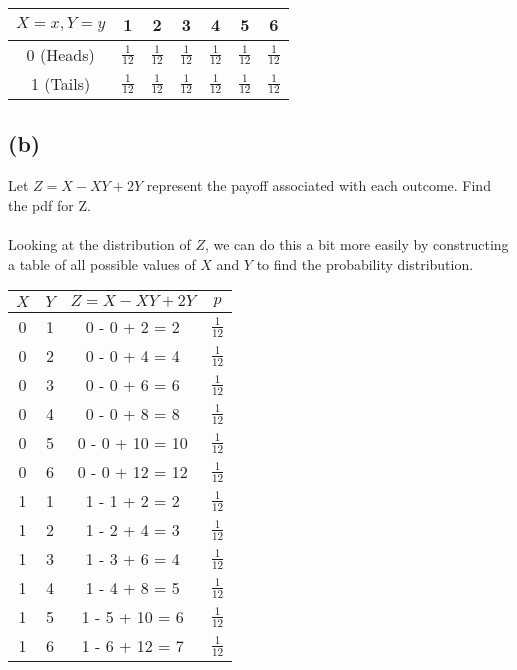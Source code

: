 \documentclass{article}
\begin{document}
{\begin{center}
\begin{tabular}{ | c | c | c | c | c | c | c | }
\hline
\(X=x, Y=y\) & 1 & 2 & 3 & 4 & 5 & 6 \\
\hline
0 (Heads) & \(\frac{1}{12}\) & \(\frac{1}{12}\) & \(\frac{1}{12}\) & \(\frac{1}{12}\) & \(\frac{1}{12}\) & \(\frac{1}{12}\) \\
\hline
1 (Tails) & \(\frac{1}{12}\) & \(\frac{1}{12}\) & \(\frac{1}{12}\) & \(\frac{1}{12}\) & \(\frac{1}{12}\) & \(\frac{1}{12}\) \\
\hline
\end{tabular}
\end{center}

\subsection*{(b)} 
Let \(Z = X - XY + 2Y\) represent the payoff associated with each outcome. Find the pdf for Z.
\\
\\
Looking at the distribution of \(Z\), we can do this a bit more easily by constructing a table of all possible values of \(X\) and \(Y\) to find the probability distribution.
\begin{center}
\begin{tabular}{ | c | c | c | c | }
\hline
\(X\) & \(Y\) & \(Z = X - XY + 2Y\) & \(p\) \\
\hline
0 & 1 & 0 - 0 + 2 = 2 & \(\frac{1}{12}\) \\
\hline
0 & 2 & 0 - 0 + 4 = 4 & \(\frac{1}{12}\) \\
\hline
0 & 3 & 0 - 0 + 6 = 6 & \(\frac{1}{12}\) \\
\hline
0 & 4 & 0 - 0 + 8 = 8 & \(\frac{1}{12}\) \\
\hline
0 & 5 & 0 - 0 + 10 = 10 & \(\frac{1}{12}\) \\
\hline
0 & 6 & 0 - 0 + 12 = 12 & \(\frac{1}{12}\) \\
\hline
1 & 1 & 1 - 1 + 2 = 2 & \(\frac{1}{12}\) \\
\hline
1 & 2 & 1 - 2 + 4 = 3 & \(\frac{1}{12}\) \\
\hline
1 & 3 & 1 - 3 + 6 = 4 & \(\frac{1}{12}\) \\
\hline
1 & 4 & 1 - 4 + 8 = 5 & \(\frac{1}{12}\) \\
\hline
1 & 5 & 1 - 5 + 10 = 6 & \(\frac{1}{12}\) \\
\hline
1 & 6 & 1 - 6 + 12 = 7 & \(\frac{1}{12}\) \\
\hline

\end{tabular}
\end{center}}
\end{document}
